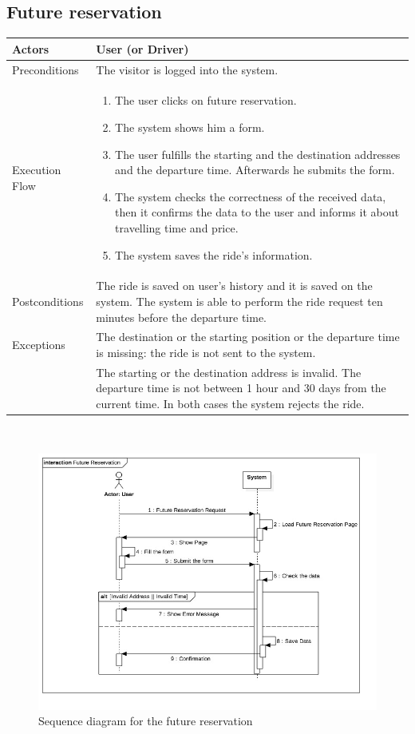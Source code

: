 \subsection{Future reservation}
\begin{tabular}{lp{8cm}}
	\hline 
	Actors & User (or Driver) \\ \hline
	Preconditions & The visitor is logged into the system. \\ \hline
	Execution Flow &  \begin{enumerate}
					\item The user clicks on future reservation.
					\item The system shows him a form.
					\item The user fulfills the starting and the destination addresses and the departure time. Afterwards he submits the form.
					\item The system checks the correctness of the received data, then it confirms the data to the user and informs it about travelling time and price.
					\item The system saves the ride's information.
					\end{enumerate}
	 \\ \hline
	 Postconditions & The ride is saved on user's history and it is saved on the system. The system is able to perform the ride request ten minutes before the departure time.\\ \hline
	 Exceptions & The destination or the starting position or the departure time is missing: the ride is not sent to the system.\\
				& The starting or the destination address is invalid. The departure time is not between 1 hour and 30 days from the current time. In both cases the system rejects the ride.  \\ \hline
\end{tabular}\\

\begin{figure}
	\centerline{\includegraphics[width=\paperwidth]{./figures/SD_FutureReservation.jpg}}
	\caption{Sequence diagram for the future reservation}
\end{figure}

